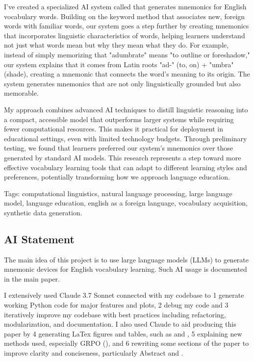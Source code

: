 I've created a specialized AI system called \linksys that generates mnemonics for English vocabulary words. Building on the keyword method that associates new, foreign words with familiar words, our system goes a step further by creating mnemonics that incorporates linguistic characteristics of words, helping learners understand not just what words mean but why they mean what they do. For example, instead of simply memorizing that "adumbrate" means "to outline or foreshadow," our system explains that it comes from Latin roots "ad-" (to, on) + "umbra" (shade), creating a mnemonic that connects the word's meaning to its origin. The system generates mnemonics that are not only linguistically grounded but also memorable.

My approach combines advanced AI techniques to distill linguistic reasoning into a compact, accessible model that outperforms larger systems while requiring fewer computational resources. This makes it practical for deployment in educational settings, even with limited technology budgets. Through preliminary testing, we found that learners preferred our system's mnemonics over those generated by standard AI models. This research represents a step toward more effective vocabulary learning tools that can adapt to different learning styles and preferences, potentially transforming how we approach language education.

Tags: computational linguistics, natural language processing, large language model, language education, english as a foreign language, vocabulary acquisition, synthetic data generation.

\subsection*{AI Statement} \label{sec:ai-statement}

The main idea of this project is to use large language models (LLMs) to generate mnemonic devices for English vocabulary learning. Such AI usage is documented in the main paper.

I extensively used Claude 3.7 Sonnet connected with my codebase to \numlist{1} generate working Python code for major features and plots, \numlist{2} debug my code and \numlist{3} iteratively improve my codebase with best practices including refactoring, modularization, and documentation. I also used Claude to aid producing this paper by \numlist{4} generating LaTex figures and tables, such as  and , \numlist{5} explaining new methods used, especially GRPO (), and \numlist{6} rewriting some sections of the paper to improve clarity and conciseness, particularly Abstract and .


